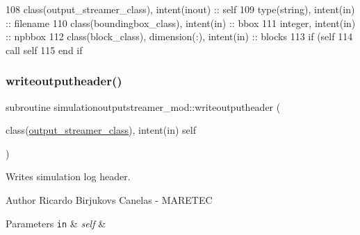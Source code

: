 \begin{DoxyCode}
108     \textcolor{keywordtype}{class}(output\_streamer\_class), \textcolor{keywordtype}{intent(inout)} :: self
109     \textcolor{keywordtype}{type}(string), \textcolor{keywordtype}{intent(in)} :: filename
110     \textcolor{keywordtype}{class}(boundingbox\_class), \textcolor{keywordtype}{intent(in)} :: bbox
111     \textcolor{keywordtype}{integer}, \textcolor{keywordtype}{intent(in)} :: npbbox
112     \textcolor{keywordtype}{class}(block\_class), \textcolor{keywordtype}{dimension(:)}, \textcolor{keywordtype}{intent(in)} :: blocks
113     \textcolor{keywordflow}{if} (self%
114         \textcolor{keyword}{call }self%
115 \textcolor{keywordflow}{    end if}
\end{DoxyCode}
\mbox{\label{namespacesimulationoutputstreamer__mod_a6f01bdc663fe5f4a842150a6aac90f67}} 
\subsubsection{\texorpdfstring{writeoutputheader()}{writeoutputheader()}}
{\footnotesize\ttfamily subroutine simulationoutputstreamer\+\_\+mod\+::writeoutputheader (\begin{DoxyParamCaption}\item[{class(\mbox{\hyperlink{structsimulationoutputstreamer__mod_1_1output__streamer__class}{output\+\_\+streamer\+\_\+class}}), intent(in)}]{self }\end{DoxyParamCaption})\hspace{0.3cm}{\ttfamily [private]}}



Writes simulation log header. 

\begin{DoxyAuthor}{Author}
Ricardo Birjukovs Canelas -\/ M\+A\+R\+E\+T\+EC 
\end{DoxyAuthor}

\begin{DoxyParams}[1]{Parameters}
\mbox{\tt in}  & {\em self} & \\
\hline
\end{DoxyParams}


